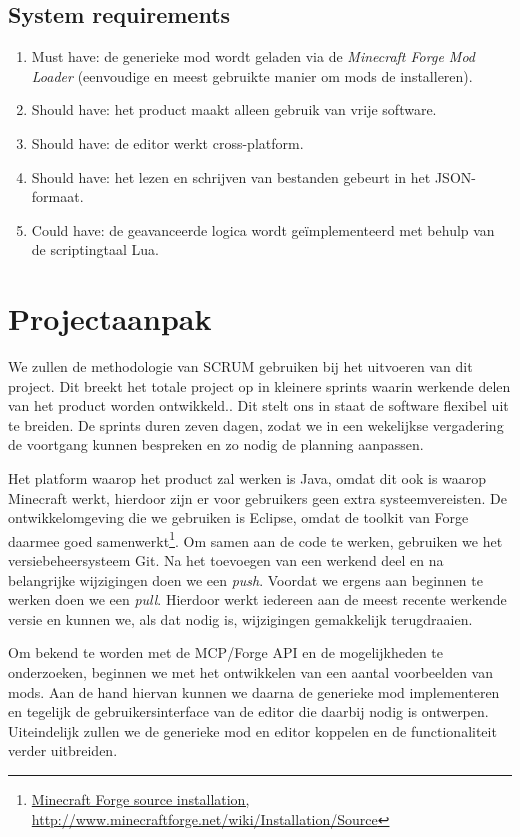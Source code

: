 \documentclass{article}
\begin{document}
	\subsection{System requirements}
	\begin{enumerate}
		\item Must have: de generieke mod wordt geladen via de \emph{Minecraft Forge Mod Loader} (eenvoudige en meest gebruikte manier om mods de installeren).
		
		\item Should have: het product maakt alleen gebruik van vrije software.
		\item Should have: de editor werkt cross-platform.
		\item Should have: het lezen en schrijven van bestanden gebeurt in het JSON-formaat.
		
		\item Could have: de geavanceerde logica wordt ge\"implementeerd met behulp van de scriptingtaal Lua.
	\end{enumerate}

\newpage

\section{Projectaanpak}
	We zullen de methodologie van SCRUM gebruiken bij het uitvoeren van dit project. Dit breekt het totale project op in kleinere sprints waarin werkende delen van het product worden ontwikkeld.. Dit stelt ons in staat de software flexibel uit te breiden. De sprints duren zeven dagen, zodat we in een wekelijkse vergadering de voortgang kunnen bespreken en zo nodig de planning aanpassen.
	
	Het platform waarop het product zal werken is Java, omdat dit ook is waarop Minecraft werkt, hierdoor zijn er voor gebruikers geen extra systeemvereisten. De ontwikkelomgeving die we gebruiken is Eclipse, omdat de toolkit van Forge daarmee goed samenwerkt\footnote{\url{Minecraft Forge source installation, http://www.minecraftforge.net/wiki/Installation/Source}}. Om samen aan de code te werken, gebruiken we het versiebeheersysteem Git. Na het toevoegen van een werkend deel en na belangrijke wijzigingen doen we een \emph{push}. Voordat we ergens aan beginnen te werken doen we een \emph{pull}. Hierdoor werkt iedereen aan de meest recente werkende versie en kunnen we, als dat nodig is, wijzigingen gemakkelijk terugdraaien.
	
	Om bekend te worden met de MCP/Forge API en de mogelijkheden te onderzoeken, beginnen we met het ontwikkelen van een aantal voorbeelden van mods. Aan de hand hiervan kunnen we daarna de generieke mod implementeren en tegelijk de gebruikersinterface van de editor die daarbij nodig is ontwerpen. Uiteindelijk zullen we de generieke mod en editor koppelen en de functionaliteit verder uitbreiden.
\end{document}
